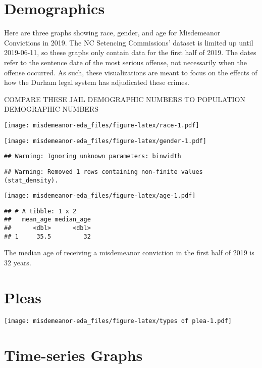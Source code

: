 \documentclass[
]{article}
\begin{document}
\hypertarget{demographics}{%
\section{Demographics}\label{demographics}}

Here are three graphs showing race, gender, and age for Misdemeanor
Convictions in 2019. The NC Setencing Commissions' dataset is limited up
until 2019-06-11, so these graphs only contain data for the first half
of 2019. The dates refer to the sentence date of the most serious
offense, not necessarily when the offense occurred. As such, these
visualizations are meant to focus on the effects of how the Durham legal
system has adjudicated these crimes.

COMPARE THESE JAIL DEMOGRAPHIC NUMBERS TO POPULATION DEMOGRAPHIC NUMBERS

\texttt{[image: misdemeanor-eda\_files/figure-latex/race-1.pdf]}

\texttt{[image: misdemeanor-eda\_files/figure-latex/gender-1.pdf]}

\begin{verbatim}
## Warning: Ignoring unknown parameters: binwidth
\end{verbatim}

\begin{verbatim}
## Warning: Removed 1 rows containing non-finite values (stat_density).
\end{verbatim}

\texttt{[image: misdemeanor-eda\_files/figure-latex/age-1.pdf]}

\begin{verbatim}
## # A tibble: 1 x 2
##   mean_age median_age
##      <dbl>      <dbl>
## 1     35.5         32
\end{verbatim}

The median age of receiving a misdemeanor conviction in the first half
of 2019 is 32 years.

\hypertarget{pleas}{%
\section{Pleas}\label{pleas}}

\texttt{[image: misdemeanor-eda\_files/figure-latex/types of plea-1.pdf]}

\hypertarget{time-series-graphs}{%
\section{Time-series Graphs}\label{time-series-graphs}}
\end{document}
